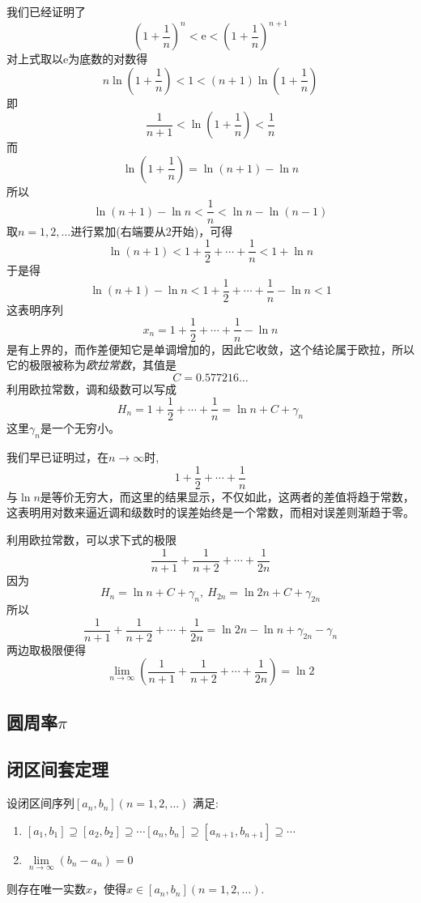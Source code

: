 我们已经证明了
\[ \left( 1+\frac{1}{n} \right)^n < \mathrm{e} < \left( 1+\frac{1}{n} \right)^{n+1} \]
对上式取以$\mathrm{e}$为底数的对数得
\[ n \ln{\left( 1+\frac{1}{n} \right)} < 1 < (n+1)\ln{\left( 1+\frac{1}{n} \right)} \]
即
\[ \frac{1}{n+1} < \ln{\left( 1+\frac{1}{n} \right)} < \frac{1}{n} \]
而
\[ \ln{\left( 1+\frac{1}{n} \right)} = \ln{(n+1)}-\ln{n} \]
所以
\[ \ln{(n+1)}-\ln{n} < \frac{1}{n} < \ln{n}-\ln{(n-1)} \]
取$n=1,2,\ldots$进行累加(右端要从2开始)，可得
\[ \ln{(n+1)} < 1 + \frac{1}{2} + \cdots + \frac{1}{n} < 1+\ln{n} \]
于是得
\[ \ln{(n+1)}-\ln{n} < 1 + \frac{1}{2} + \cdots + \frac{1}{n} - \ln{n} < 1 \]
这表明序列
\[ x_n = 1 + \frac{1}{2} + \cdots + \frac{1}{n} - \ln{n} \]
是有上界的，而作差便知它是单调增加的，因此它收敛，这个结论属于欧拉，所以它的极限被称为\emph{欧拉常数}，其值是
\[ C=0.577216\ldots \]
利用欧拉常数，调和级数可以写成
\[ H_n = 1 + \frac{1}{2} + \cdots + \frac{1}{n} = \ln{n} + C + \gamma_n \]
这里$\gamma_n$是一个无穷小。

我们早已证明过，在$n \to \infty$时,
\[ 1 + \frac{1}{2} + \cdots + \frac{1}{n} \]
与$\ln{n}$是等价无穷大，而这里的结果显示，不仅如此，这两者的差值将趋于常数，这表明用对数来逼近调和级数时的误差始终是一个常数，而相对误差则渐趋于零。

\begin{example}
  \label{example:limit-of-sum-of-i/n+1-i-in-(1-n)}
  利用欧拉常数，可以求下式的极限
  \[ \frac{1}{n+1}+\frac{1}{n+2}+\cdots+\frac{1}{2n} \]
  因为
  \[ H_n = \ln{n} + C + \gamma_n, \  H_{2n}=\ln{2n}+C+\gamma_{2n} \]
  所以
  \[ \frac{1}{n+1}+\frac{1}{n+2}+\cdots+\frac{1}{2n} = \ln{2n}-\ln{n}+\gamma_{2n}-\gamma_n \]
  两边取极限便得
  \[ \lim_{n \to \infty} \left( \frac{1}{n+1}+\frac{1}{n+2}+\cdots+\frac{1}{2n} \right) = \ln{2} \]
\end{example}

\subsection{圆周率$\pi$}
\label{sec:pi}



\subsection{闭区间套定理}
\label{sec:theorem-of-closed-interval-sequence}

\begin{theorem}[闭区间套定理]
  \label{closed-interval-sequence-theorem}
  设闭区间序列$[a_n,b_n](n=1,2,\ldots)$ 满足:
  \begin{enumerate}
  \item $[a_1,b_1] \supseteq [a_2,b_2] \supseteq \cdots [a_n,b_n] \supseteq [a_{n+1},b_{n+1}] \supseteq \cdots$
  \item $\lim\limits_{n \to \infty} (b_n-a_n) = 0$
  \end{enumerate}
    则存在唯一实数$x$，使得$x \in [a_n,b_n](n=1,2,\ldots)$.
\end{theorem}

